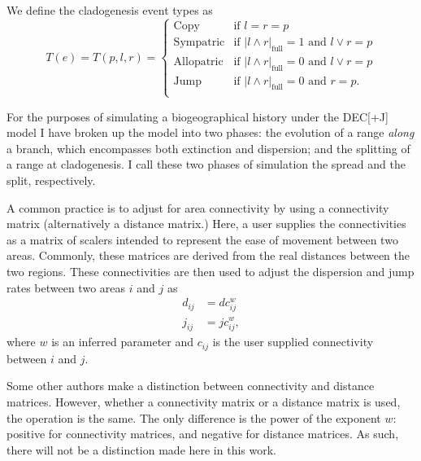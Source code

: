 \documentclass[a4paper]{article}
\newcommand{\CountFull}[1]{|#1|_\text{full}}
\newcommand{\decj}{DEC[+J]}
\newcommand{\rand}[2]{#1 \land #2}
\newcommand{\ror}[2]{#1 \lor #2}
\begin{document}
We define the cladogenesis event types as
\begin{equation}
T(e) = T(p, l, r) = 
\begin{cases}
  \text{Copy} & \text{if }l = r = p \\ 
  \text{Sympatric} & \text{if } \CountFull{\rand{l}{r}} = 1 \text{ and } \ror{l}{r} = p \\ 
  \text{Allopatric} & \text{if } \CountFull{\rand{l}{r}} = 0 \text{ and } \ror{l}{r} = p   \\ 
  \text{Jump} & \text{if } \CountFull{\rand{l}{r}} = 0 \text{ and } r = p. \\ 
\end{cases}
\label{eq:clad-test}
\end{equation}

For the purposes of simulating a biogeographical history under the \decj{} model I have broken up the model into two
phases: the evolution of a range \textit{along} a branch, which encompasses both extinction and dispersion; and the
splitting of a range at cladogenesis.
I call these two phases of simulation the spread and the split, respectively.


A common practice is to adjust for area connectivity by using a connectivity matrix (alternatively a distance
matrix.)\footnotemark
Here, a user supplies the connectivities as a matrix of scalers intended to represent the ease of movement
between two areas.
Commonly, these matrices are derived from the real distances between the two regions.
These connectivities are then used to adjust the dispersion and jump rates between two areas $i$ and $j$ as
\begin{align*}
  d_{ij} &= d c_{ij}^w \\
  j_{ij} &= j c_{ij}^w,
\end{align*}
where $w$ is an inferred parameter and $c_{ij}$ is the user supplied connectivity between $i$ and $j$.

Some other authors make a distinction between connectivity and distance matrices.
However, whether a connectivity matrix or a distance matrix is used, the operation is the same.
The only difference is the power of the exponent $w$: positive for connectivity matrices, and negative for
distance matrices.
As such, there will not be a distinction made here in this work.
\end{document}
